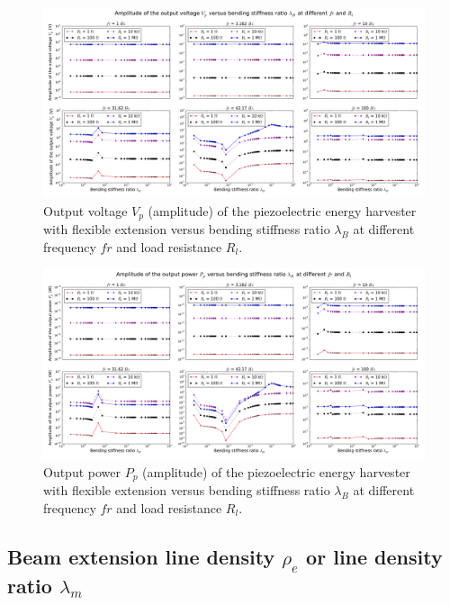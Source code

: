 \documentclass{elsarticle}
\begin{document}
\begin{figure}[!htbp]
    \centering
    \includegraphics[width=\textwidth]{./fig_vol_fr_sl_Rl_sl_vs_lamB}
    \caption{Output voltage $V_p$ (amplitude) of the piezoelectric energy harvester with flexible extension versus bending stiffness ratio $\lambda_B$ at different frequency $fr$ and load resistance $R_l$. }
    \label{fig:fig_vol_fr_sl_Rl_sl_vs_lamB}
\end{figure}

\begin{figure}[!htbp]
    \centering
    \includegraphics[width=\textwidth]{./fig_pow_fr_sl_Rl_sl_vs_lamB}
    \caption{Output power $P_p$ (amplitude) of the piezoelectric energy harvester with flexible extension versus bending stiffness ratio $\lambda_B$ at different frequency $fr$ and load resistance $R_l$. }
    \label{fig:fig_pow_fr_sl_Rl_sl_vs_lamB}
\end{figure}


\subsection{Beam extension line density $\rho_e$ or line density ratio $\lambda_m$}
\end{document}
